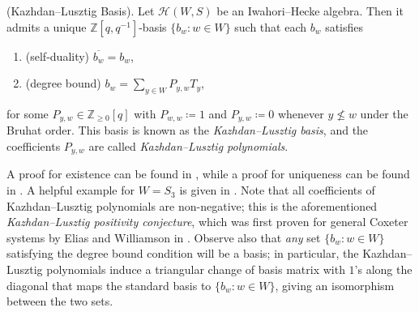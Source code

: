 \noindent\begin{theoremdefinition}\textnormal{(Kazhdan--Lusztig Basis).} Let $\mathscr{H}(W, S)$ be an Iwahori--Hecke algebra. Then it admits a unique $\mathbb{Z}[q, q^{-1}]$-basis $\{b_w : w \in W\}$ such that each $b_w$ satisfies
\begin{enumerate}[label=$\bullet$, leftmargin=4\parindent]
\item (self-duality) $\overline{b_w} = b_w$,
\item (degree bound) $b_w = \sum_{y \in W}{P_{y,w} T_y}$,
\end{enumerate}
\noindent for some $P_{y,w} \in \mathbb{Z}_{\geq 0}[q]$ with $P_{w,w} \coloneqq 1$ and $P_{y,w} \coloneqq 0$ whenever $y \nleq w$ under the Bruhat order. This basis is known as the {\em Kazhdan--Lusztig basis}, and the coefficients $P_{y,w}$ are called {\em Kazhdan--Lusztig polynomials}.\\
\end{theoremdefinition}

\noindent A proof for existence can be found in \cite[Theorem 3.25]{EMTW20}, while a proof for uniqueness can be found in \cite[Lemma 3.10]{EMTW20}. A helpful example for $W = S_3$ is given in \cite[\S 3.3.1]{EMTW20}. Note that all coefficients of Kazhdan--Lusztig polynomials are non-negative; this is the aforementioned {\em Kazhdan--Lusztig positivity conjecture}, which was first proven for general Coxeter systems by Elias and Williamson in \cite[Corollary 1.2]{EW14}. Observe also that {\em any} set $\{b_w : w \in W\}$ satisfying the degree bound condition will be a basis; in particular, the Kazhdan--Lusztig polynomials induce a triangular change of basis matrix with $1$'s along the diagonal that maps the standard basis to $\{b_w : w \in W\}$, giving an isomorphism between the two sets.\\

